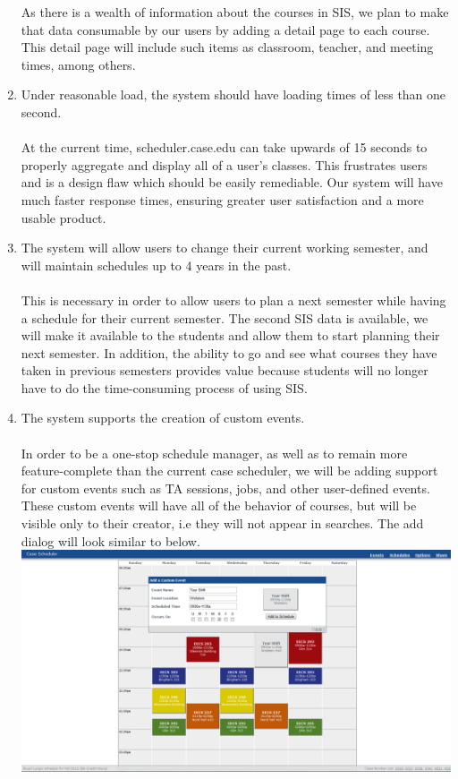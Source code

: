 \documentclass[pdftex,12pt,letter]{article}
\begin{document}
\begin{enumerate}[1.]
As there is a wealth of information about the courses in SIS, we plan to make that data consumable by our users by adding a detail page to each course. This detail page will include such items as classroom, teacher, and meeting times, among others.
\item Under reasonable load, the system should have loading times of less than one second.\\\\
At the current time, scheduler.case.edu can take upwards of 15 seconds to properly aggregate and display all of a user's classes. This frustrates users and is a design flaw which should be easily remediable. Our system will have much faster response times, ensuring greater user satisfaction and a more usable product.
\item The system will allow users to change their current working semester, and will maintain schedules up to 4 years in the past.\\\\
This is necessary in order to allow users to plan a next semester while having a schedule for their current semester. The second SIS data is available, we will make it available to the students and allow them to start planning their next semester. In addition, the ability to go and see what courses they have taken in previous semesters provides value because students will no longer have to do the time-consuming process of using SIS.
\item The system supports the creation of custom events.\\\\
In order to be a one-stop schedule manager, as well as to remain more feature-complete than the current case scheduler, we will be adding support for custom events such as TA sessions, jobs, and other user-defined events. These custom events will have all of the behavior of courses, but will be visible only to their creator, i.e they will not appear in searches. The add dialog will look similar to below.\\
\includegraphics[width=130mm]{add_event.png}
\end{enumerate}
\end{document}
